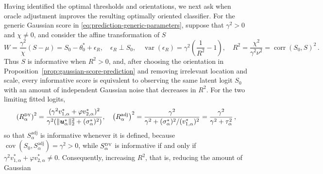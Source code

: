 \documentclass{article}
\makeatletter
\DeclareMathOperator{\var}{var}
\DeclareMathOperator{\cov}{cov}
\theoremstyle{definition}
\newcommand{\vnorm}[1]{%
	\ensuremath{%
		\if@display
		\left\| #1 \right\|
		\else
		\| #1 \|
		\fi
	}%
}
\newcommand*{\bb}{\boldsymbol}
\def\bu{\bb{u}}
\makeatother
\begin{document}
\begin{bibunit}
Having identified the optimal thresholds and orientations, we next ask when
oracle adjustment improves the resulting optimally oriented classifier. For
the generic Gaussian score in \eqref{eq:prediction-generic-parameters},
suppose that $\gamma^2>0$ and $\chi\neq0$, and consider the affine
transformation of $S$
\begin{equation}
\label{eq:prediction-gaussian-channel-main}
    W = \frac{\gamma^2}{\chi}(S-\mu)
    =
    S_0-\theta_0^*+\epsilon_R,
    \quad
    \epsilon_R\perp S_0,
    \quad
    \var(\epsilon_R)
    =
    \gamma^2\left(\frac{1}{R^2}-1\right), 
    \quad
    R^2
    =
    \frac{\chi^2}{\gamma^2\nu^2}
    =
    \operatorname{corr}(S_0,S)^2 \,.
\end{equation}
Thus $S$ is informative when $R^2>0$, and, after choosing the
orientation in Proposition~\ref{prop:gaussian-score-prediction} and
removing irrelevant location and scale, every informative score is
equivalent to observing the same latent logit $S_0$ with an amount of
independent Gaussian noise that decreases in $R^2$. 
For the two limiting fitted logits,
\begin{equation}
\label{eq:prediction-information-logits}
\begin{aligned}
    \left(R_\alpha^{\textrm{\tiny DY}}\right)^2
    =
    \frac{
        (
            \gamma^2v_{1,\alpha}^*
            +\varphi v_{2,\alpha}^*
        )^2
    }{
        \gamma^2
        (
            \vnorm{\bu_\alpha^*}_2^2
            +(\sigma_\alpha^*)^2
        )
    },\quad 
    \left(R_\alpha^{\textrm{adj}}\right)^2
    =
    \frac{\gamma^2}{
        \gamma^2
        +(\sigma_\alpha^*)^2/(v_{1,\alpha}^*)^2
    }
    =
    \frac{\gamma^2}{\gamma^2+\tau_\alpha^2} \,, 
\end{aligned}
\end{equation}
so that 
$S_\alpha^{\mathrm{adj}}$ is informative whenever it is defined, because
$\cov(S_0,S_\alpha^{\mathrm{adj}})=\gamma^2>0$, while
$S_\alpha^{\textrm{\tiny DY}}$ is informative if and only if
$\gamma^2v_{1,\alpha}^*+\varphi v_{2,\alpha}^*\neq0$.
Consequently,
increasing $R^2$, that is, reducing the amount of Gaussian

\end{bibunit}
\end{document}
